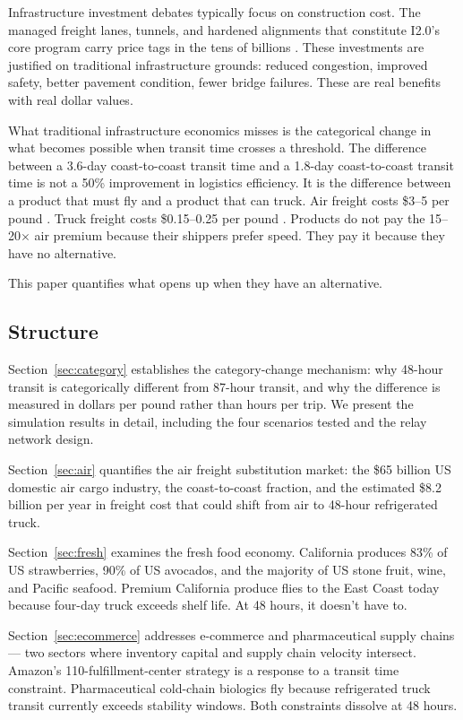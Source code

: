 Infrastructure investment debates typically focus on construction cost. The managed freight
lanes, tunnels, and hardened alignments that constitute I2.0's core program carry price tags
in the tens of billions \citep{ROUTE_E1}. These investments are justified on traditional
infrastructure grounds: reduced congestion, improved safety, better pavement condition,
fewer bridge failures. These are real benefits with real dollar values.

What traditional infrastructure economics misses is the categorical change in what becomes
possible when transit time crosses a threshold. The difference between a 3.6-day coast-to-coast
transit time and a 1.8-day coast-to-coast transit time is not a 50\% improvement in logistics
efficiency. It is the difference between a product that must fly and a product that can truck.
Air freight costs \$3--5 per pound \citep{BTS_airfreight2023}. Truck freight costs
\$0.15--0.25 per pound \citep{FHWA_freight2023}. Products do not pay the 15--20$\times$ air
premium because their shippers prefer speed. They pay it because they have no alternative.

This paper quantifies what opens up when they have an alternative.

\subsection*{Structure}

Section~\ref{sec:category} establishes the category-change mechanism: why 48-hour transit is
categorically different from 87-hour transit, and why the difference is measured in dollars
per pound rather than hours per trip. We present the simulation results in detail, including
the four scenarios tested and the relay network design.

Section~\ref{sec:air} quantifies the air freight substitution market: the \$65 billion US
domestic air cargo industry, the coast-to-coast fraction, and the estimated \$8.2 billion per
year in freight cost that could shift from air to 48-hour refrigerated truck.

Section~\ref{sec:fresh} examines the fresh food economy. California produces 83\% of US
strawberries, 90\% of US avocados, and the majority of US stone fruit, wine, and Pacific
seafood. Premium California produce flies to the East Coast today because four-day truck
exceeds shelf life. At 48 hours, it doesn't have to.

Section~\ref{sec:ecommerce} addresses e-commerce and pharmaceutical supply chains --- two
sectors where inventory capital and supply chain velocity intersect. Amazon's 110-fulfillment-center
strategy is a response to a transit time constraint. Pharmaceutical cold-chain biologics fly
because refrigerated truck transit currently exceeds stability windows. Both constraints dissolve
at 48 hours.


